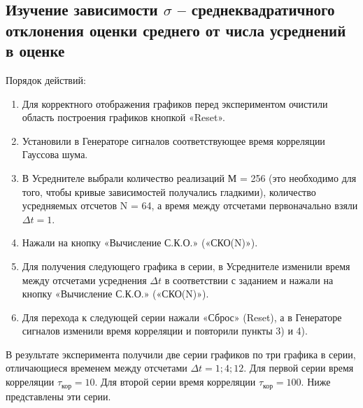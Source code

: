 \subsection[Задание 3]{Изучение зависимости $\sigma$ -- среднеквадратичного отклонения оценки среднего от числа усреднений в оценке}
Порядок действий:
\begin{enumerate}
	\item Для корректного отображения графиков перед экспериментом очистили область построения графиков кнопкой «Reset».
	\item Установили в Генераторе сигналов соответствующее время корреляции Гауссова шума.
	\item В Усреднителе выбрали количество реализаций М = 256 (это необходимо для того, чтобы кривые зависимостей получались гладкими), количество усредняемых отсчетов N = 64, а время между отсчетами первоначально взяли $\Delta t = 1$.
	\item Нажали на кнопку «Вычисление С.К.О.» («СКО(N)»).
	\item Для получения следующего графика в серии, в Усреднителе изменили время между отсчетами усреднения $\Delta t$ в
	соответствии с заданием и нажали на кнопку «Вычисление С.К.О.» («СКО(N)»).
	\item Для перехода к следующей серии нажали «Сброс» (Reset), а в Генераторе сигналов изменили время корреляции и повторили пункты 3) и 4).
\end{enumerate}
В результате эксперимента получили две серии графиков по три графика в серии, отличающиеся временем между отсчетами $\Delta t=1; 4; 12$.
Для первой серии время корреляции $\tau_\text{кор} = 10$. Для второй серии время корреляции $\tau_\text{кор} = 100$.
Ниже представлены эти серии.

